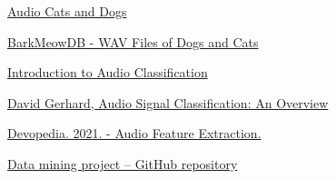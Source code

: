 \documentclass[12pt a4paper]{article}
\numberwithin{equation}{section}
\begin{document}
\begin{thebibliography}{6}
 \href{https://www.kaggle.com/mmoreaux/audio-cats-and-dogs}{Audio Cats and Dogs}

 \href{https://zenodo.org/record/3563990#.YZ99xtDMK3B}{BarkMeowDB - WAV Files of Dogs and Cats}

 \href{https://www.analyticsvidhya.com/blog/2021/06/introduction-to-audio-classification/}{Introduction to Audio Classification}

 \href{http://www2.cs.uregina.ca/~gerhard/publications/CAI00.pdf}{David Gerhard, Audio Signal Classification: An Overview}

 \href{https://devopedia.org/audio-feature-extraction}{Devopedia. 2021. - Audio Feature Extraction.}

 \href{https://github.com/portikattila/Data_mining_project}{Data mining project -- GitHub repository}

\end{thebibliography}
\end{document}
